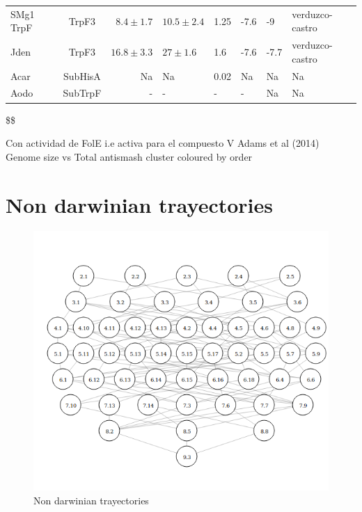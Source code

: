 \documentclass[12pt,twoside]{reedthesis}
\begin{document}
\begin{tabular}{ l c r l l l l l}
  SMg1 TrpF &TrpF3   &$8.4\pm1.7$    &$10.5\pm2.4$    &1.25       &-7.6    &-9        &verduzco-castro     \\ [1ex] 
  Jden      &TrpF3   &$16.8\pm3.3$   &$27\pm1.6$      &1.6        &-7.6    &-7.7      &verduzco-castro     \\ [1ex] 
  Acar      &SubHisA &Na         &Na          &0.02       &Na      &Na        &Na                                    \\ [1ex] 
  Aodo      &SubTrpF &-          &-           &-          &-       &Na        &Na                                    \\ [1ex]
  
  \hline
  \end{tabular}
  
  \label{table:mi table}\$\$
  
  Con actividad de FolE i.e activa para el compuesto V Adams et al (2014)
  Genome size vs Total antismash cluster coloured by order
  
  \clearpage  
  
  \section{Non darwinian trayectories}\label{non-darwinian-trayectories}
  
  \begin{figure}[h!tbp]
  \centering
  \includegraphics[angle = 0,scale = 0.6]{conclusion/Solocirculos.png}
  \caption[Non darwinian trayectories]{\normalsize{Non darwinian trayectories}}
  \label{fig:PriARutas}
  \end{figure}
  
\end{document}
